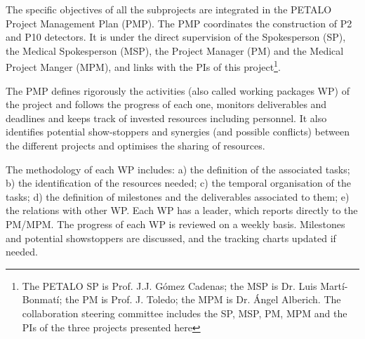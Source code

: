 The specific objectives of all the subprojects are integrated in the PETALO Project Management Plan (PMP). The PMP coordinates the construction of P2 and P10 detectors. It is under the direct supervision of the Spokesperson (SP), the Medical Spokesperson (MSP), the Project Manager (PM) and the Medical Project Manger (MPM), and links with the PIs of this project\footnote{The PETALO SP is Prof. J.J. Gómez Cadenas; the MSP is Dr. Luis Martí-Bonmatí; the PM is Prof. J. Toledo; the MPM is Dr. Ángel Alberich. The collaboration steering committee includes the SP, MSP, PM, MPM and the PIs of the three projects presented here}. 

The PMP defines rigorously the activities (also called working packages WP) of the project and follows the progress of each one, monitors deliverables and deadlines and keeps track of invested resources including personnel. It also identifies potential show-stoppers and synergies (and possible conflicts) between the different projects and optimises the sharing of resources. 



The methodology of each WP includes: a) the definition of the associated tasks; b) the identification of the resources needed; c) the temporal organisation of the tasks; d) the definition of milestones and the deliverables associated to them; e) the relations with other WP. Each WP has a leader, which reports directly to the PM/MPM. The progress of each WP is reviewed on a weekly basis. Milestones and potential showstoppers are discussed, and the tracking charts updated if needed. 